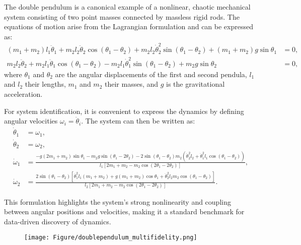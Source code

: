 The double pendulum is a canonical example of a nonlinear, chaotic mechanical system consisting of two point masses connected by massless rigid rods. The equations of motion arise from the Lagrangian formulation and can be expressed as:
\begin{equation}
\begin{aligned}
(m_1 + m_2) l_1 \ddot{\theta}_1 + m_2 l_2 \ddot{\theta}_2 \cos(\theta_1 - \theta_2)
+ m_2 l_2 \dot{\theta}_2^2 \sin(\theta_1 - \theta_2)
+ (m_1 + m_2) g \sin \theta_1 &= 0, \\
m_2 l_2 \ddot{\theta}_2 + m_2 l_1 \ddot{\theta}_1 \cos(\theta_1 - \theta_2)
- m_2 l_1 \dot{\theta}_1^2 \sin(\theta_1 - \theta_2)
+ m_2 g \sin \theta_2 &= 0,
\end{aligned}
\label{eq:double_pendulum}
\end{equation}
where $\theta_1$ and $\theta_2$ are the angular displacements of the first and second pendula, $l_1$ and $l_2$ their lengths, $m_1$ and $m_2$ their masses, and $g$ is the gravitational acceleration.

For system identification, it is convenient to express the dynamics by defining angular velocities $\omega_i = \dot{\theta}_i$. The system can then be written as:
\begin{equation}
\begin{aligned}
\dot{\theta}_1 &= \omega_1, \\
\dot{\theta}_2 &= \omega_2, \\
\dot{\omega}_1 &= \frac{
    -g(2m_1 + m_2)\sin\theta_1 - m_2 g \sin(\theta_1 - 2\theta_2)
    - 2 \sin(\theta_1 - \theta_2) m_2 \left(
        \dot{\theta}_2^2 l_2 + \dot{\theta}_1^2 l_1 \cos(\theta_1 - \theta_2)
    \right)
}{
    l_1 \left[ 2m_1 + m_2 - m_2 \cos(2\theta_1 - 2\theta_2) \right]
}, \\
\dot{\omega}_2 &= \frac{
    2 \sin(\theta_1 - \theta_2)
    \left[
        \dot{\theta}_1^2 l_1 (m_1 + m_2)
        + g (m_1 + m_2) \cos\theta_1
        + \dot{\theta}_2^2 l_2 m_2 \cos(\theta_1 - \theta_2)
    \right]
}{
    l_2 \left[ 2m_1 + m_2 - m_2 \cos(2\theta_1 - 2\theta_2) \right]
}.
\end{aligned}
\label{eq:double_pendulum_first_order}
\end{equation}

This formulation highlights the system’s strong nonlinearity and coupling between angular positions and velocities, making it a standard benchmark for data-driven discovery of dynamics.

\begin{figure}
    \begin{center}
        \texttt{[image: Figure/doublependulum\_multifidelity.png]}
    \end{center}
\end{figure}

